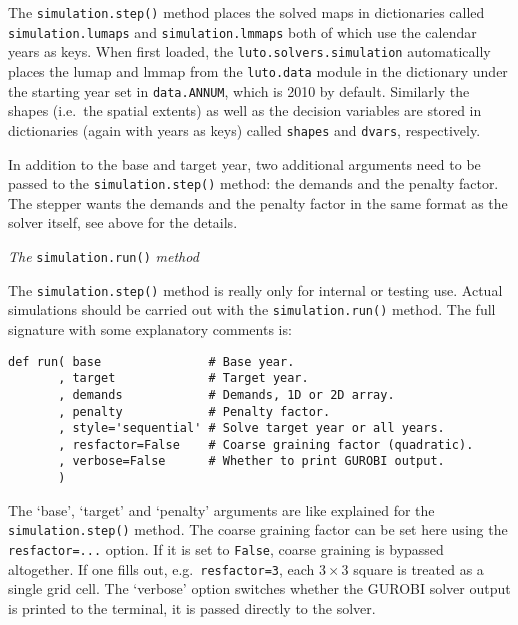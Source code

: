 \documentclass[12pt,a4paper,twoside]{article}
\begin{document}
The \texttt{simulation.step()} method places the solved maps in dictionaries called \texttt{simulation.lumaps} and \texttt{simulation.lmmaps} both of which use the calendar years as keys. When first loaded, the \texttt{luto.solvers.simulation} automatically places the lumap and lmmap from the \texttt{luto.data} module in the dictionary under the starting year set in \texttt{data.ANNUM}, which is 2010 by default. Similarly the shapes (i.e.\ the spatial extents) as well as the decision variables are stored in dictionaries (again with years as keys) called \texttt{shapes} and \texttt{dvars}, respectively.

In addition to the base and target year, two additional arguments need to be passed to the \texttt{simulation.step()} method: the demands and the penalty factor. The stepper wants the demands and the penalty factor in the same format as the solver itself, see above for the details.

\emph{The} \texttt{simulation.run()} \emph{method}

The \texttt{simulation.step()} method is really only for internal or testing use. Actual simulations should be carried out with the \texttt{simulation.run()} method. The full signature with some explanatory comments is:

\begin{verbatim}
def run( base               # Base year.
       , target             # Target year.
       , demands            # Demands, 1D or 2D array.
       , penalty            # Penalty factor.
       , style='sequential' # Solve target year or all years.
       , resfactor=False    # Coarse graining factor (quadratic).
       , verbose=False      # Whether to print GUROBI output.
       )
\end{verbatim}

The `base', `target' and `penalty' arguments are like explained for the \texttt{simulation.step()} method. The coarse graining factor can be set here using the \texttt{resfactor=...} option. If it is set to \texttt{False}, coarse graining is bypassed altogether. If one fills out, e.g.\ \texttt{resfactor=3}, each $3 \times 3$ square is treated as a single grid cell. The `verbose' option switches whether the GUROBI solver output is printed to the terminal, it is passed directly to the solver.
\end{document}
